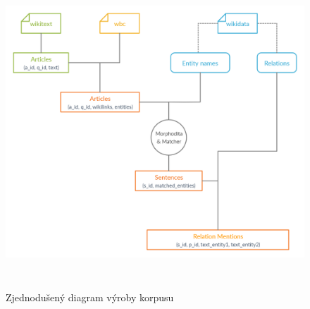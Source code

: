 \begin{figure}[p]\centering
\includegraphics[width=140mm, height=117mm]{./img/Corpus_diagram}
\caption{Zjednodušený diagram výroby korpusu}
\label{obr03:Nhust}
\end{figure}